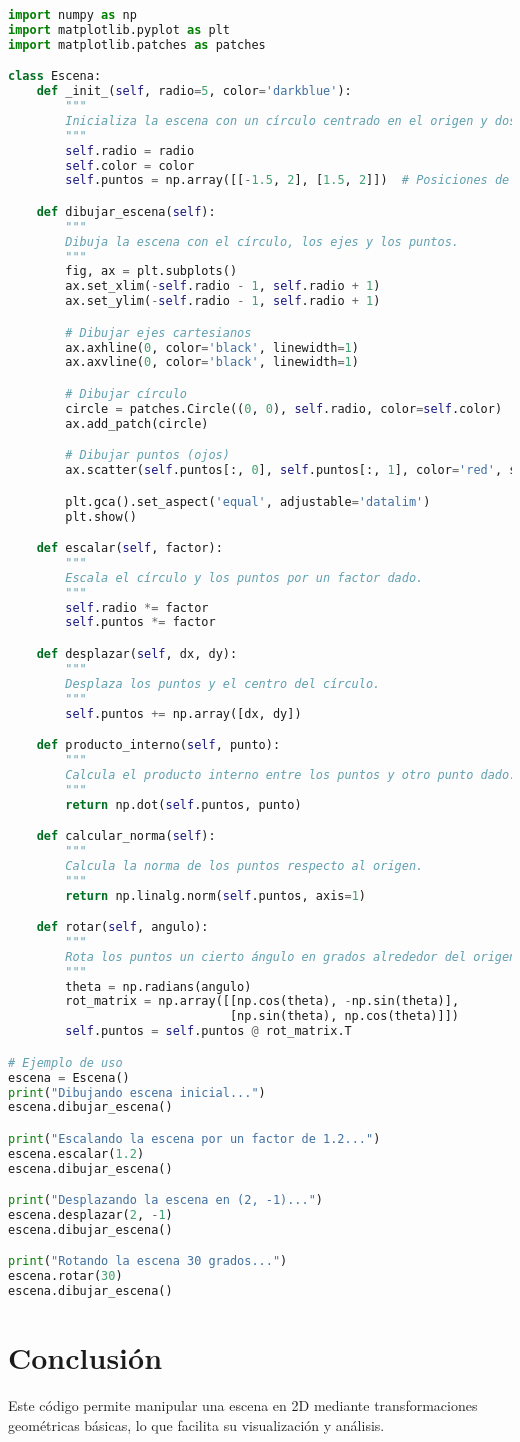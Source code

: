 \documentclass{article}
\begin{document}
\begin{lstlisting}[language=Python, caption=Código Python para manejar la escena]
import numpy as np
import matplotlib.pyplot as plt
import matplotlib.patches as patches

class Escena:
    def _init_(self, radio=5, color='darkblue'):
        """
        Inicializa la escena con un círculo centrado en el origen y dos puntos simulando ojos.
        """
        self.radio = radio
        self.color = color
        self.puntos = np.array([[-1.5, 2], [1.5, 2]])  # Posiciones de los ojos

    def dibujar_escena(self):
        """
        Dibuja la escena con el círculo, los ejes y los puntos.
        """
        fig, ax = plt.subplots()
        ax.set_xlim(-self.radio - 1, self.radio + 1)
        ax.set_ylim(-self.radio - 1, self.radio + 1)

        # Dibujar ejes cartesianos
        ax.axhline(0, color='black', linewidth=1)
        ax.axvline(0, color='black', linewidth=1)

        # Dibujar círculo
        circle = patches.Circle((0, 0), self.radio, color=self.color)
        ax.add_patch(circle)

        # Dibujar puntos (ojos)
        ax.scatter(self.puntos[:, 0], self.puntos[:, 1], color='red', s=100)

        plt.gca().set_aspect('equal', adjustable='datalim')
        plt.show()

    def escalar(self, factor):
        """
        Escala el círculo y los puntos por un factor dado.
        """
        self.radio *= factor
        self.puntos *= factor

    def desplazar(self, dx, dy):
        """
        Desplaza los puntos y el centro del círculo.
        """
        self.puntos += np.array([dx, dy])

    def producto_interno(self, punto):
        """
        Calcula el producto interno entre los puntos y otro punto dado.
        """
        return np.dot(self.puntos, punto)

    def calcular_norma(self):
        """
        Calcula la norma de los puntos respecto al origen.
        """
        return np.linalg.norm(self.puntos, axis=1)

    def rotar(self, angulo):
        """
        Rota los puntos un cierto ángulo en grados alrededor del origen.
        """
        theta = np.radians(angulo)
        rot_matrix = np.array([[np.cos(theta), -np.sin(theta)],
                               [np.sin(theta), np.cos(theta)]])
        self.puntos = self.puntos @ rot_matrix.T

# Ejemplo de uso
escena = Escena()
print("Dibujando escena inicial...")
escena.dibujar_escena()

print("Escalando la escena por un factor de 1.2...")
escena.escalar(1.2)
escena.dibujar_escena()

print("Desplazando la escena en (2, -1)...")
escena.desplazar(2, -1)
escena.dibujar_escena()

print("Rotando la escena 30 grados...")
escena.rotar(30)
escena.dibujar_escena()
\end{lstlisting}

\section{Conclusión}
Este código permite manipular una escena en 2D mediante transformaciones geométricas básicas, lo que facilita su visualización y análisis.
\end{document}
